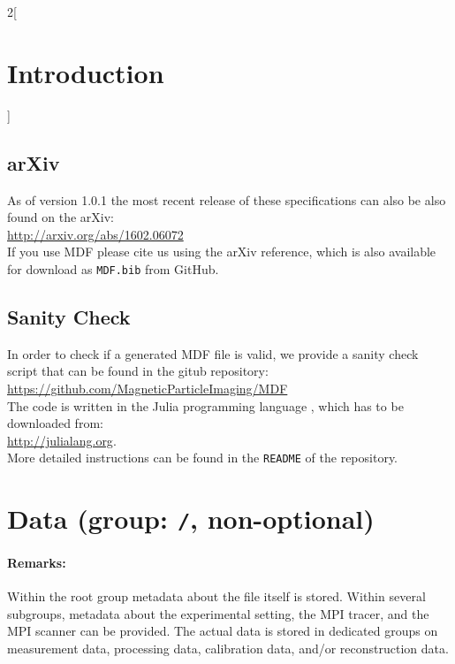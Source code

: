\documentclass[landscape,a4paper]{article} %
\newcommand{\inl}[1]{\lstinline[columns=fixed]{#1}}
\begin{document}
\begin{multicols}{2}[\section{Introduction} \label{Sec:Introduction}]
\subsection{arXiv}
As of version 1.0.1 the most recent release of these specifications can also be also found on the arXiv:\\
\hspace*{1cm}\url{http://arxiv.org/abs/1602.06072}\\
If you use MDF please cite us using the arXiv reference, which is also available for download as \texttt{MDF.bib} from GitHub.

\subsection{Sanity Check}

In order to check if a generated MDF file is valid, we provide a sanity check script that can be found in the gitub repository:\\
\hspace*{1cm}\url{https://github.com/MagneticParticleImaging/MDF}\\
The code is written in the Julia programming language \cite{Bezanson2012,Bezanson2014,Bezanson2014a}, which has to be downloaded from: \\
\hspace*{1cm} \url{http://julialang.org}.\\
More detailed instructions can be found in the \texttt{README} of the repository.

\end{multicols}


\section{Data (group: \inl{/}, non-optional)}
 \setlength\extrarowheight{5pt}

\begin{multicols}{2}
\paragraph{Remarks:} Within the root group metadata about the file itself is stored. Within several subgroups, metadata about the experimental setting, the MPI tracer, and the MPI scanner can be provided. The actual data is stored in dedicated groups on measurement data, processing data, calibration data, and/or reconstruction data.
\end{multicols}
\end{document}
